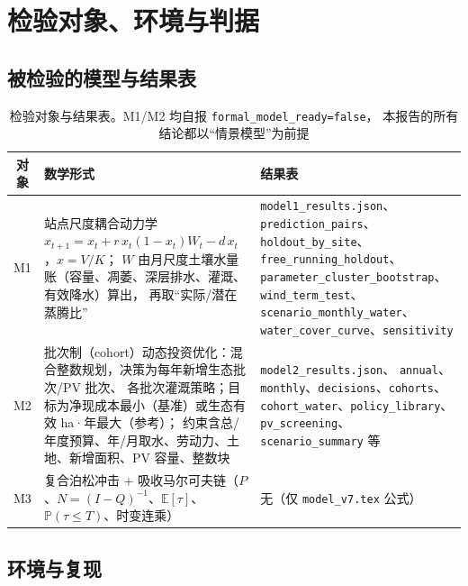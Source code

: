 \documentclass[11pt,a4paper]{ctexart}
\newcommand{\E}{\mathbb{E}}
\newcommand{\Prob}{\mathbb{P}}
\begin{document}
\section{检验对象、环境与判据}

\subsection{被检验的模型与结果表}

\begin{table}[htbp]\centering\footnotesize
\begin{tabularx}{\textwidth}{|c|X|X|}
\toprule
对象 & 数学形式 & 结果表 \\
\midrule
M1 & 站点尺度耦合动力学
     $x_{t+1}=x_t+r\,x_t(1-x_t)W_t-d\,x_t$，$x=V/K$；
     $W$ 由月尺度土壤水量账（容量、凋萎、深层排水、灌溉、有效降水）算出，
     再取“实际/潜在蒸腾比” & \texttt{model1\_results.json}、
     \texttt{prediction\_pairs}、\texttt{holdout\_by\_site}、
     \texttt{free\_running\_holdout}、\texttt{parameter\_cluster\_bootstrap}、
     \texttt{wind\_term\_test}、\texttt{scenario\_monthly\_water}、
     \texttt{water\_cover\_curve}、\texttt{sensitivity} \\
M2 & 批次制（cohort）动态投资优化：混合整数规划，决策为每年新增生态批次/PV 批次、
     各批次灌溉策略；目标为净现成本最小（基准）或生态有效 ha·年最大（参考）；
     约束含总/年度预算、年/月取水、劳动力、土地、新增面积、PV 容量、整数块 & \texttt{model2\_results.json}、
     \texttt{annual}、\texttt{monthly}、\texttt{decisions}、\texttt{cohorts}、
     \texttt{cohort\_water}、\texttt{policy\_library}、\texttt{pv\_screening}、
     \texttt{scenario\_summary} 等 \\
M3 & 复合泊松冲击 + 吸收马尔可夫链（$P$、$N=(I-Q)^{-1}$、$\E[\tau]$、$\Prob(\tau\le T)$、时变连乘）
     & 无（仅 \texttt{model\_v7.tex} 公式） \\
\bottomrule
\end{tabularx}
\caption{检验对象与结果表。M1/M2 均自报 \texttt{formal\_model\_ready=false}，
本报告的所有结论都以“情景模型”为前提}\label{tab:object}
\end{table}

\subsection{环境与复现}
\end{document}
